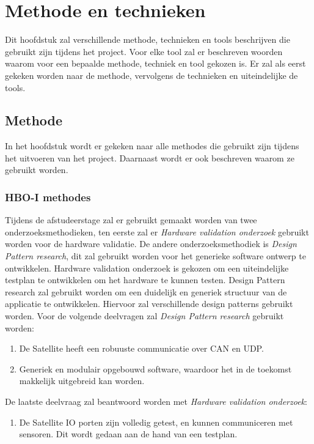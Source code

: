\chapter{Methode en technieken}
Dit hoofdstuk zal verschillende methode, technieken en tools beschrijven die gebruikt zijn tijdens het project. Voor elke tool zal er beschreven woorden waarom voor een bepaalde methode, techniek en tool gekozen is. Er zal als eerst gekeken worden naar de methode, vervolgens de technieken en uiteindelijke de tools.

\section{Methode}
In het hoofdstuk wordt er gekeken naar alle methodes die gebruikt zijn tijdens het uitvoeren van het project. Daarnaast wordt er ook beschreven waarom ze gebruikt worden.

\subsection{HBO-I methodes}
Tijdens de afstudeerstage zal er gebruikt gemaakt worden van twee onderzoeksmethodieken, ten eerste zal er \textit{Hardware validation onderzoek} gebruikt worden voor de hardware validatie. De andere onderzoeksmethodiek is \textit{Design Pattern research}, dit zal gebruikt worden voor het generieke software ontwerp te ontwikkelen\parencite{researchmethods}. Hardware validation onderzoek is gekozen om een uiteindelijke testplan te ontwikkelen om het hardware te kunnen testen. Design Pattern research zal gebruikt worden om een duidelijk en generiek structuur van de applicatie te ontwikkelen. Hiervoor zal verschillende design patterns gebruikt worden. Voor de volgende deelvragen zal \textit{Design Pattern research} gebruikt worden: 
\begin{enumerate}
	\item De Satellite heeft een robuuste communicatie over CAN en UDP.
	\item Generiek en modulair opgebouwd software, waardoor het in de toekomst makkelijk uitgebreid kan worden.
\end{enumerate}

\noindent De laatste deelvraag zal beantwoord worden met \textit{Hardware validation onderzoek}:
\begin{enumerate}
	\item De Satellite IO porten zijn volledig getest, en kunnen communiceren met sensoren. Dit wordt gedaan aan de hand van een testplan.
\end{enumerate}

